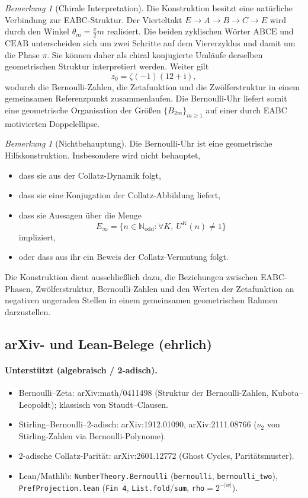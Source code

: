 \documentclass[11pt,a4paper]{article}
\theoremstyle{definition}
\theoremstyle{remark}
\newtheorem{remark}[definition]{Bemerkung}
\newcommand{\Nodd}{\mathbb{N}_{\mathrm{odd}}}
\newcommand{\Einf}{E_{\infty}}
\begin{document}
\begin{remark}[Chirale Interpretation]
Die Konstruktion besitzt eine natürliche Verbindung zur EABC-Struktur.
Der Vierteltakt
$E\to A\to B\to C\to E$
wird durch den Winkel $\theta_m=\frac{\pi}{2}m$ realisiert.
Die beiden zyklischen Wörter $\mathrm{ABCE}$ und $\mathrm{CEAB}$
unterscheiden sich um zwei Schritte auf dem Viererzyklus und damit um die
Phase $\pi$.
Sie können daher als chiral konjugierte Umläufe derselben geometrischen
Struktur interpretiert werden.
Weiter gilt
\[
z_0=\zeta(-1)(12+\mathrm{i}),
\]
wodurch die Bernoulli-Zahlen, die Zetafunktion und die Zwölferstruktur in
einem gemeinsamen Referenzpunkt zusammenlaufen.
Die Bernoulli-Uhr liefert somit eine geometrische Organisation der Größen
$\{B_{2m}\}_{m\ge 1}$ auf einer durch EABC motivierten Doppelellipse.
\end{remark}

\begin{remark}[Nichtbehauptung]
Die Bernoulli-Uhr ist eine geometrische Hilfskonstruktion.
Insbesondere wird nicht behauptet,
\begin{itemize}[nosep]
\item dass sie aus der Collatz-Dynamik folgt,
\item dass sie eine Konjugation der Collatz-Abbildung liefert,
\item dass sie Aussagen über die Menge
\[
\Einf=\{n\in\Nodd:\forall K,\ U^K(n)\neq 1\}
\]
impliziert,
\item oder dass aus ihr ein Beweis der Collatz-Vermutung folgt.
\end{itemize}
Die Konstruktion dient ausschließlich dazu, die Beziehungen zwischen
EABC-Phasen, Zwölferstruktur, Bernoulli-Zahlen und den Werten der
Zetafunktion an negativen ungeraden Stellen in einem gemeinsamen
geometrischen Rahmen darzustellen.
\end{remark}

\subsection{arXiv- und Lean-Belege (ehrlich)}

\paragraph{Unterstützt (algebraisch / 2-adisch).}
\begin{itemize}[nosep]
  \item Bernoulli--Zeta: arXiv:math/0411498 (Struktur der Bernoulli-Zahlen,
    Kubota--Leopoldt); klassisch von Staudt--Clausen.
  \item Stirling--Bernoulli--2-adisch: arXiv:1912.01090, arXiv:2111.08766
    ($\nu_2$ von Stirling-Zahlen via Bernoulli-Polynome).
  \item 2-adische Collatz-Parität: arXiv:2601.12772 (Ghost Cycles, Paritätsmuster).
  \item Lean/Mathlib: \texttt{NumberTheory.Bernoulli} (\texttt{bernoulli},
    \texttt{bernoulli\_two}), \texttt{PrefProjection.lean}
    (\texttt{Fin~4}, \texttt{List.fold}/\texttt{sum}, \texttt{rho}$=2^{-|w|}$).
\end{itemize}
\end{document}
